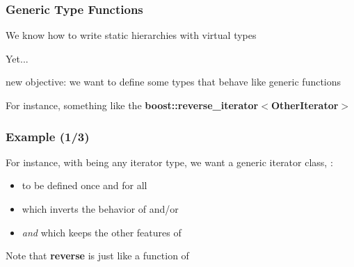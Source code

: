 \begin{frame}
  \frametitle{Generic Type Functions}


\begin{block}{}
  We know how to write static hierarchies with virtual types
\end{block}

% 
\bigskip
% 

Yet...

% 
\bigskip
%

\begin{block}{new objective:}
  we want to define some types that behave like generic functions
\end{block}

% 
\bigskip
\bigskip
%

For instance, something like the {\scriptsize{\textbf{boost::reverse\_iterator$<$OtherIterator$>$}}} \\
{\scriptsize {} }



\end{frame}



\begin{frame}
  \frametitle{Example (1/3)}


For instance, with \bfI being any iterator type, we want a
generic iterator class, \bfreverseI:

%
\bigskip
%

\begin{itemize}
\item to be defined once and for all
  \smallskip
\item which inverts the behavior of \bfnext and/or \bfprev
  \smallskip
\item \textit{and} which keeps the other features of \bfI
\end{itemize}

%
\bigskip
%

Note that \textbf{reverse} is just like a function of \bfI

\end{frame}



